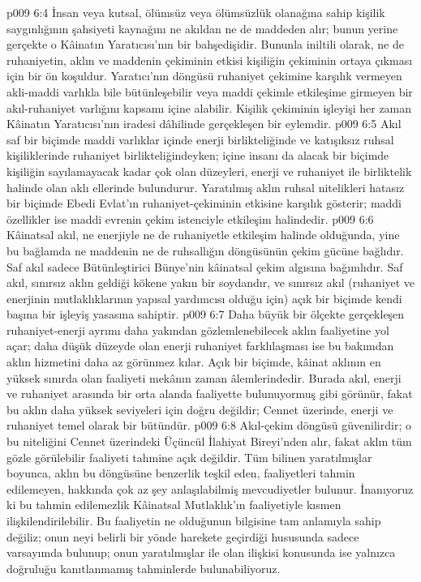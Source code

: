 \vs p009 6:4 İnsan veya kutsal, ölümsüz veya ölümsüzlük olanağına sahip kişilik saygınlığının şahsiyeti kaynağını ne akıldan ne de maddeden alır; bunun yerine gerçekte o Kâinatın Yaratıcısı’nın bir bahşedişidir. Bununla iniltili olarak, ne de ruhaniyetin, aklın ve maddenin çekiminin etkisi kişiliğin çekiminin ortaya çıkması için bir ön koşuldur. Yaratıcı’nın döngüsü ruhaniyet çekimine karşılık vermeyen akli\hyp{}maddi varlıkla bile bütünleşebilir veya maddi çekimle etkileşime girmeyen bir akıl\hyp{}ruhaniyet varlığını kapsamı içine alabilir. Kişilik çekiminin işleyişi her zaman Kâinatın Yaratıcısı’nın iradesi dâhilinde gerçekleşen bir eylemdir.
\vs p009 6:5 Akıl saf bir biçimde maddi varlıklar içinde enerji birlikteliğinde ve katışıksız ruhsal kişiliklerinde ruhaniyet birlikteliğindeyken; içine insanı da alacak bir biçimde kişiliğin sayılamayacak kadar çok olan düzeyleri, enerji ve ruhaniyet ile birliktelik halinde olan aklı ellerinde bulundurur. Yaratılmış aklın ruhsal nitelikleri hatasız bir biçimde Ebedi Evlat’ın ruhaniyet\hyp{}çekiminin etkisine karşılık gösterir; maddi özellikler ise maddi evrenin çekim istenciyle etkileşim halindedir.
\vs p009 6:6 Kâinatsal akıl, ne enerjiyle ne de ruhaniyetle etkileşim halinde olduğunda, yine bu bağlamda ne maddenin ne de ruhsallığın döngüsünün çekim gücüne bağlıdır. Saf akıl sadece Bütünleştirici Bünye’nin kâinatsal çekim algısına bağımlıdır. Saf akıl, sınırsız aklın geldiği kökene yakın bir soydandır, ve sınırsız akıl (ruhaniyet ve enerjinin mutlaklıklarının yapısal yardımcısı olduğu için) açık bir biçimde kendi başına bir işleyiş yasasına sahiptir.
\vs p009 6:7 Daha büyük bir ölçekte gerçekleşen ruhaniyet\hyp{}enerji ayrımı daha yakından gözlemlenebilecek aklın faaliyetine yol açar; daha düşük düzeyde olan enerji ruhaniyet farklılaşması ise bu bakımdan aklın hizmetini daha az görünmez kılar. Açık bir biçimde, kâinat aklının en yüksek sınırda olan faaliyeti mekânın zaman âlemlerindedir. Burada akıl, enerji ve ruhaniyet arasında bir orta alanda faaliyette bulunuyormuş gibi görünür, fakat bu aklın daha yüksek seviyeleri için doğru değildir; Cennet üzerinde, enerji ve ruhaniyet temel olarak bir bütündür.
\vs p009 6:8 Akıl\hyp{}çekim döngüsü güvenilirdir; o bu niteliğini Cennet üzerindeki Üçüncül İlahiyat Bireyi’nden alır, fakat aklın tüm gözle görülebilir faaliyeti tahmine açık değildir. Tüm bilinen yaratılmışlar boyunca, aklın bu döngüsüne benzerlik teşkil eden, faaliyetleri tahmin edilemeyen, hakkında çok az şey anlaşılabilmiş mevcudiyetler bulunur. İnanıyoruz ki bu tahmin edilemezlik Kâinatsal Mutlaklık’ın faaliyetiyle kısmen ilişkilendirilebilir. Bu faaliyetin ne olduğunun bilgisine tam anlamıyla sahip değiliz; onun neyi belirli bir yönde harekete geçirdiği hususunda sadece varsayımda bulunup; onun yaratılmışlar ile olan ilişkisi konusunda ise yalnızca doğruluğu kanıtlanmamış tahminlerde bulunabiliyoruz.
